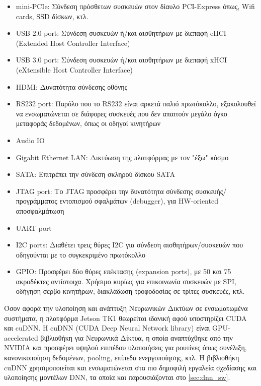 \begin{itemize}
  \setlength\itemsep{0em}
  \item{mini-PCIe: Σύνδεση πρόσθετων συσκευών στον δίαυλο PCI-Express όπως, Wifi cards, SSD δίσκων, κτλ.}
  \item{USB 2.0 port: Σύνδεση συσκευών ή/και αισθητήρων με διεπαφή eHCI (Extended Host Controller Interface)}
  \item{USB 3.0 port: Σύνδεση συσκευών ή/και αισθητήρων με διεπαφή xHCI (eXtensible Host Controller Interface)}
  \item{HDMI: Δυνατότητα σύνδεσης οθόνης}
  \item{RS232 port: Παρόλο που το RS232 είναι αρκετά παλιό πρωτόκολλο, εξακολουθεί να ενσωματώνεται σε διάφορες συσκευές που δεν απαιτούν μεγάλο όγκο μεταφοράς δεδομένων, όπως οι οδηγοί κινητήρων}
  \item{Audio IO}
  \item{Gigabit Ethernet LAN: Δικτύωση της πλατφόρμας με τον "έξω" κόσμο}
  \item{SATA: Επιτρέπει την σύνδεση σκληρού δίσκου SATA}
  \item{JTAG port: Το JTAG προσφέρει την δυνατότητα σύνδεσης συσκευής/προγράμματος εντοπισμού σφαλμάτων (debugger), για HW-oriented αποσφαλμάτωση}
  \item{UART port}
  \item{I2C ports: Διαθέτει τρεις θύρες I2C για σύνδεση αισθητήρων/συσκευών που οδηγούνται με το συγκεκριμένο πρωτόκολλο}
  \item{GPIO: Προσφέρει δύο θύρες επέκτασης (expansion ports), με 50 και 75 ακροδέκτες αντίστοιχα. Χρήσιμο κυρίως για επικοινωνία συσκευών με SPI, οδήγηση σερβο-κινητήρων, διακλάδωση τροφοδοσίας σε τρίτες συσκευές, κτλ.}
\end{itemize}

Όσον αφορά την υλοποίηση και ανάπτυξη Νευρωνικών Δικτύων σε ενσωματωμένα συστήματα,
η πλατφόρμα Jetson TK1 θεωρείται ιδανική αφού υποστηρίζει CUDA και cuDNN.
H cuDNN (CUDA Deep Neural Network library) είναι GPU-accelerated βιβλιοθήκη για Νευρωνικά Δίκτυα,
η οποία αναπτύχθηκε από την NVIDIA και προσφέρει υψηλού επιπέδου υλοποιήσεις για ρουτίνες όπως συνέλιξη,
κανονικοποίηση δεδομένων, pooling, επίπεδα ενεργοποίησης, κτλ.
Η βιβλιοθήκη cuDNN χρησιμοποιείται και ενσωματώνεται στα πιο δημοφιλή εργαλεία σχεδίασης και υλοποίησης μοντέλων DNN,
τα οποία και παρουσιάζονται στο \autoref{sec:dnn_sw}.

